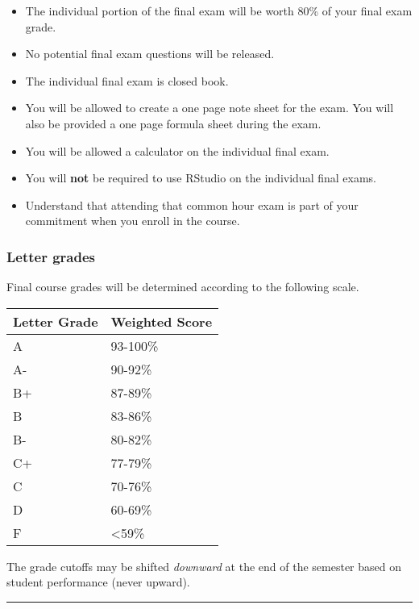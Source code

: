 \documentclass[
]{article}
\providecommand{\tightlist}{%
  \setlength{\itemsep}{0pt}\setlength{\parskip}{0pt}}
\begin{document}
\begin{itemize}
\tightlist
\item
  The individual portion of the final exam will be worth 80\% of your
  final exam grade.
\item
  No potential final exam questions will be released.
\item
  The individual final exam is closed book.
\item
  You will be allowed to create a one page note sheet for the exam. You
  will also be provided a one page formula sheet during the exam.
\item
  You will be allowed a calculator on the individual final exam.
\item
  You will \textbf{not} be required to use RStudio on the individual
  final exams.
\item
  Understand that attending that common hour exam is part of your
  commitment when you enroll in the course.
\end{itemize}

\subsubsection{Letter grades}\label{letter-grades}

Final course grades will be determined according to the following scale.

\begin{longtable}[]{@{}ll@{}}
\toprule\noalign{}
Letter Grade & Weighted Score \\
\midrule\noalign{}
\endhead
\bottomrule\noalign{}
\endlastfoot
A & 93-100\% \\
A- & 90-92\% \\
B+ & 87-89\% \\
B & 83-86\% \\
B- & 80-82\% \\
C+ & 77-79\% \\
C & 70-76\% \\
D & 60-69\% \\
F & \textless59\% \\
\end{longtable}

The grade cutoffs may be shifted \emph{downward} at the end of the
semester based on student performance (never upward).

\begin{center}\rule{0.5\linewidth}{0.5pt}\end{center}
\end{document}
